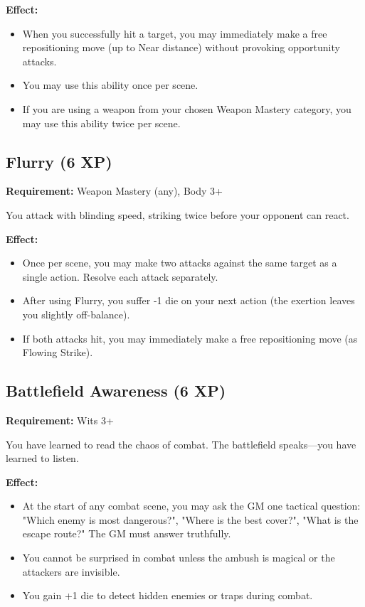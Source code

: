 \textbf{Effect:}
\begin{itemize}
\item When you successfully hit a target, you may immediately make a free repositioning move (up to Near distance) without provoking opportunity attacks.
\item You may use this ability once per scene.
\item If you are using a weapon from your chosen Weapon Mastery category, you may use this ability twice per scene.
\end{itemize}

\subsection{Flurry (6 XP)}

\textbf{Requirement:} Weapon Mastery (any), Body 3+

You attack with blinding speed, striking twice before your opponent can react.

\textbf{Effect:}
\begin{itemize}
\item Once per scene, you may make two attacks against the same target as a single action. Resolve each attack separately.
\item After using Flurry, you suffer -1 die on your next action (the exertion leaves you slightly off-balance).
\item If both attacks hit, you may immediately make a free repositioning move (as Flowing Strike).
\end{itemize}

\subsection{Battlefield Awareness (6 XP)}

\textbf{Requirement:} Wits 3+

You have learned to read the chaos of combat. The battlefield speaks—you have learned to listen.

\textbf{Effect:}
\begin{itemize}
\item At the start of any combat scene, you may ask the GM one tactical question: "Which enemy is most dangerous?", "Where is the best cover?", "What is the escape route?" The GM must answer truthfully.
\item You cannot be surprised in combat unless the ambush is magical or the attackers are invisible.
\item You gain +1 die to detect hidden enemies or traps during combat.
\end{itemize}

